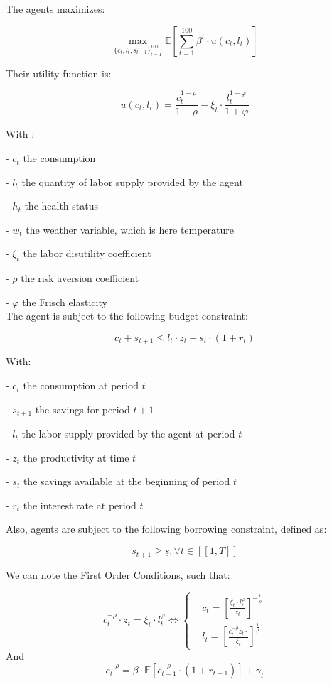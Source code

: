 \documentclass{article}
\begin{document}
The agents maximizes: 

$$ \max_{\{c_{t},l_{t},s_{t+1}\}_{t=1}^{100}}{\mathbb{E}\left[\sum_{t=1}^{100} \beta^{t}\cdot u(c_t,l_t)\right]}$$

Their utility function is: 

$$u(c_{t},l_{t}) = \frac{c_{t}^{1-\rho}}{1-\rho}-\xi_{t}\cdot \frac{l_{t}^{1+\varphi}}{1+\varphi}$$

With : 

-  $c_{t}$  the consumption

-  $l_{t}$  the quantity of labor supply provided by the agent

-  $h_{t}$  the health status

-  $w_{t}$  the weather variable, which is here temperature

-  $\xi_{t}$ the labor disutility coefficient

- $\rho$ the risk aversion coefficient

- $\varphi$ the Frisch elasticity
\\

The agent is subject to the following budget constraint:

$$c_{t} + s_{t+1} \leq l_{t}\cdot z_{t} + s_{t}\cdot(1+r_{t})$$

With: 

-  $c_t$ the consumption at period $t$

-  $s_{t+1}$ the savings for period $t+1$

-  $l_t$ the labor supply provided by the agent at period $t$

-  $z_t$ the productivity at time $t$

-  $s_{t}$ the savings available at the beginning of period $t$

-  $r_{t}$ the interest rate at period $t$

Also, agents are subject to the following borrowing constraint, defined as: 

$$s_{t+1}\geq \underline{s}, \forall t \in [\![1,T]\!]$$


We can note the First Order Conditions, such that: 

\begin{equation}
    c^{-\rho}_{t}\cdot z_{t} = \xi_{t}\cdot l_{t}^{\varphi} \iff
        \begin{cases}
        & c_t = \left[\frac{\xi_{t}\cdot l_{t}^{\varphi}}{z_{t}}\right]^{-\frac{1}{\rho}}\\ 
        & l_{t} = \left[\frac{c_{t}^{-\rho}z_{t}\cdot}{\xi_{t}}\right]^{\frac{1}{\rho}}
    \end{cases}
\end{equation}
And 
\begin{equation}
    c^{-\rho}_{t} = \beta \cdot \mathbb{E}\left[c^{-\rho}_{t+1}\cdot (1+r_{t+1})\right] + \gamma_{t}
\end{equation}
\end{document}
